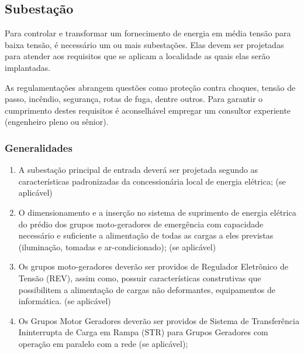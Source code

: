 \subsection{Subestação} \label{section: power plant}

Para controlar e transformar um fornecimento de energia em média tensão para baixa tensão, é necessário um ou mais subestações. Elas devem ser projetadas para atender aos requisitos que se aplicam a localidade as quais elas serão implantadas.

As regulamentações abrangem questões como proteção contra choques, tensão de passo, incêndio, segurança, rotas de fuga, dentre outros. Para garantir o cumprimento destes requisitos é aconselhável empregar um consultor experiente (engenheiro pleno ou sênior).

\subsubsection{Generalidades}

\begin{enumerate}
	\item A subestação principal de entrada deverá ser projetada segundo as características padronizadas da concessionária local de energia elétrica; (se aplicável)
	
	\item O dimensionamento e a inserção no sistema de suprimento de energia elétrica do prédio dos grupos moto-geradores de emergência com capacidade necessário e suficiente a alimentação de todas as cargas a eles previstas (iluminação, tomadas e ar-condicionado); (se aplicável)
	
	\item Os grupos moto-geradores deverão ser providos de Regulador Eletrônico de Tensão (REV), assim como, possuir características construtivas que possibilitem a alimentação de cargas não deformantes, equipamentos de informática. (se aplicável)
	
	\item Os Grupos Motor Geradores deverão ser providos de Sistema de Transferência Ininterrupta de Carga em Rampa (STR) para Grupos Geradores com operação em paralelo com a rede (se aplicável);	
	
\end{enumerate}
